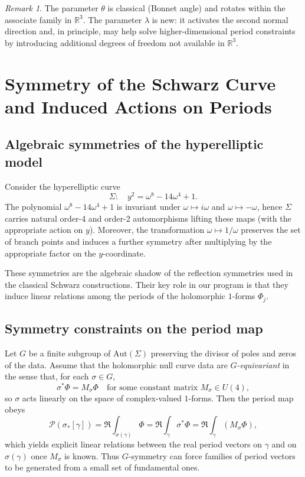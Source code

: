 \documentclass[12pt]{article}
\numberwithin{equation}{section}
\theoremstyle{definition}
\theoremstyle{remark}
\newtheorem{remark}[theorem]{Remark}
\begin{document}
\begin{remark}
The parameter $\theta$ is classical (Bonnet angle) and rotates within the associate family in $\mathbb{R}^3$.
The parameter $\lambda$ is new: it activates the second normal direction and, in principle, may help solve higher-dimensional period constraints by introducing additional degrees of freedom not available in $\mathbb{R}^3$.
\end{remark}


\section{Symmetry of the Schwarz Curve and Induced Actions on Periods}\label{sec:symmetry}

\subsection{Algebraic symmetries of the hyperelliptic model}

Consider the hyperelliptic curve
\[
\Sigma:\quad y^2=\omega^8-14\omega^4+1.
\]
The polynomial $\omega^8-14\omega^4+1$ is invariant under $\omega\mapsto i\omega$ and $\omega\mapsto -\omega$, hence $\Sigma$ carries natural order-4 and order-2 automorphisms lifting these maps (with the appropriate action on $y$).
Moreover, the transformation $\omega\mapsto 1/\omega$ preserves the set of branch points and induces a further symmetry after multiplying by the appropriate factor on the $y$-coordinate.

These symmetries are the algebraic shadow of the reflection symmetries used in the classical Schwarz constructions.
Their key role in our program is that they induce linear relations among the periods of the holomorphic $1$-forms $\Phi_j$.

\subsection{Symmetry constraints on the period map}

Let $G$ be a finite subgroup of $\mathrm{Aut}(\Sigma)$ preserving the divisor of poles and zeros of the data.
Assume that the holomorphic null curve data are \emph{$G$-equivariant} in the sense that, for each $\sigma\in G$,
\[
\sigma^*\Phi = M_\sigma \Phi
\quad\text{for some constant matrix } M_\sigma\in U(4),
\]
so $\sigma$ acts linearly on the space of complex-valued $1$-forms.
Then the period map obeys
\[
\mathcal{P}(\sigma_*[\gamma])=\Re\int_{\sigma(\gamma)}\Phi
=\Re\int_\gamma \sigma^*\Phi
=\Re\int_\gamma (M_\sigma\Phi),
\]
which yields explicit linear relations between the real period vectors on $\gamma$ and on $\sigma(\gamma)$ once $M_\sigma$ is known.
Thus $G$-symmetry can force families of period vectors to be generated from a small set of fundamental ones.
\end{document}
